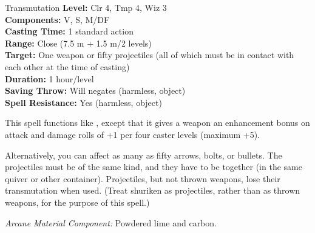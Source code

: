 {Transmutation}
{
	\textbf{Level:}
	Clr 4, Tmp 4, Wiz 3\\
	\textbf{Components:}
	V, S, M/DF\\
	\textbf{Casting Time:}
	1 standard action\\
	\textbf{Range:}
	Close (7.5 m + 1.5 m/2 levels)\\
	\textbf{Target:}
	One weapon or fifty projectiles (all of which must be in contact with each other at the time of casting)\\
	\textbf{Duration:}
	1 hour/level\\
	\textbf{Saving Throw:}
	Will negates (harmless, object)\\
	\textbf{Spell Resistance:}
	Yes (harmless, object)\\
}
{
	This spell functions like , except that it gives a weapon an enhancement bonus on attack and damage rolls of +1 per four caster levels (maximum +5).

	Alternatively, you can affect as many as fifty arrows, bolts, or bullets. The projectiles must be of the same kind, and they have to be together (in the same quiver or other container). Projectiles, but not thrown weapons, lose their transmutation when used. (Treat shuriken as projectiles, rather than as thrown weapons, for the purpose of this spell.)

	\textit{Arcane Material Component:}
	Powdered lime and carbon.

}
